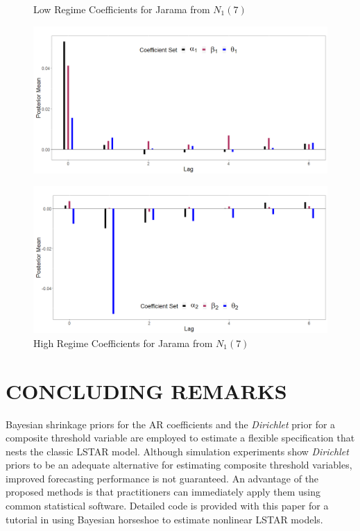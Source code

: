 \begin{figure}[!h]
\center
\begin{minipage}[h]{\textwidth}
\caption{Low Regime Coefficients for Jarama from $N_1(7)$}
\label{fig:jar1}
\includegraphics[scale=0.3]{JaramaL}
\end{minipage} \hspace{\textwidth}
\begin{minipage}[h]{\textwidth}
\caption{High Regime Coefficients for Jarama from $N_1(7)$}
\label{fig:jar2}
\includegraphics[scale=0.3]{JaramaH}
\end{minipage}
\end{figure}

\section{CONCLUDING REMARKS}

Bayesian shrinkage priors for the AR coefficients and the \textit{Dirichlet} prior for a composite threshold variable are employed to estimate a flexible specification that nests the classic LSTAR model. Although simulation experiments show \textit{Dirichlet} priors to be an adequate alternative for estimating composite threshold variables, improved forecasting performance is not guaranteed. An advantage of the proposed methods is that practitioners can immediately apply them using common statistical software. Detailed code is provided with this paper for a tutorial in using Bayesian horseshoe to estimate nonlinear LSTAR models.

